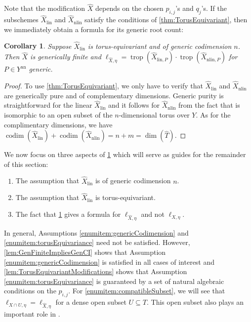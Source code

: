 \documentclass[12pt,reqno,a4paper]{amsart}
\makeatletter
\theoremstyle{theoremstyle}
\newtheorem{corollary}[theorem]{Corollary}
\theoremstyle{examplestyle}
\theoremstyle{algorithmstyle}
\DeclareMathOperator{\codim}{codim}
\DeclareMathOperator{\trop}{trop}
\newcommand{\customlabel}[2]{%
   \protected@write \@auxout {}{\string \newlabel {#1}{{#2}{\thepage}{#2}{#1}{}} }%
   \hypertarget{#1}{#2}%
}
\makeatother
\begin{document}
Note that the modification $\widehat X$ depends on the chosen $p_{i,j}$'s and $q_j$'s. If the subschemes $\hat{X}_{\mathrm{lin}}$ and $\hat{X}_{\mathrm{nlin}}$ satisfy the conditions of \cref{thm:TorusEquivariant}, then we immediately obtain a formula for its generic root count:

\begin{corollary}\label{cor:genericRootCountModification}
  Suppose $\widehat{X}_{\mathrm{lin}}$ is torus-equivariant and of generic codimension $n$. Then $\widehat{X}$ is generically finite and $\ell_{\widehat X,\eta}=\trop(\widehat{X}_{\mathrm{lin},P})\cdot\trop(\widehat{X}_{\mathrm{nlin},P})$ for $P\in Y^{\mathrm{an}}$ generic.
\end{corollary}
\begin{proof}
  To use \cref{thm:TorusEquivariant}, we only have to verify that $\widehat{X}_{\mathrm{lin}}$ and $\widehat{X}_{\mathrm{nlin}}$ are generically pure and of complementary dimensions.  Generic purity is straightforward for the linear $\widehat{X}_{\mathrm{lin}}$ and it follows for $\widehat{X}_{\mathrm{nlin}}$ from the fact that is isomorphic to an open subset of the $n$-dimensional torus over $Y$.  As for the complimentary dimensions, we have $\codim(\widehat{X}_{\mathrm{lin}})+\codim(\widehat{X}_{\mathrm{nlin}})=n+m=\dim(\widehat T)$.
\end{proof}

\noindent
We now focus on three aspects of \cref{cor:genericRootCountModification}
which will serve as guides for the remainder of this section:
\begin{enumerate}
\item[\customlabel{enumitem:genericCodimension}{(a)}] The assumption that $\widehat{X}_{\mathrm{lin}}$ is of generic codimension $n$.
\item[\customlabel{enumitem:torusEquivariance}{(b)}] The assumption that $\widehat{X}_{\mathrm{lin}}$ is torus-equivariant.
\item[\customlabel{enumitem:compatibleSubset}{(c)}] The fact that \cref{cor:genericRootCountModification} gives a formula for $\ell_{\widehat X,\eta}$ and not $\ell_{X,\eta}$.
\end{enumerate}
In general, Assumptions \ref{enumitem:genericCodimension} and \ref{enumitem:torusEquivariance} need not be satisfied. %
However, \cref{lem:GenFiniteImpliesGenCI} shows that Assumption \ref{enumitem:genericCodimension} is satisfied in all cases of interest and \cref{lem:TorusEquivariantModifications} shows that Assumption \ref{enumitem:torusEquivariance} is guaranteed by a set of natural algebraic conditions on the $p_{i,j}$. For \ref{enumitem:compatibleSubset}, we will see that $\ell_{X\cap U,\eta}=\ell_{\widehat{X},\eta}$ for a dense open subset $U\subseteq{T}$. This open subset also plays an important role in \cite{KavehKhovanskii2010,KavehKhovanskii2012}.
\end{document}
